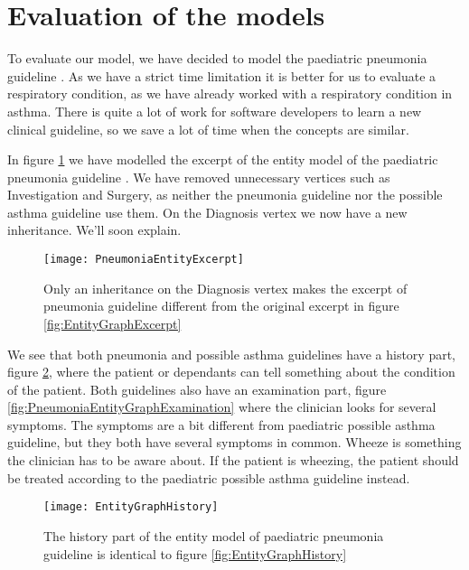 \section{Evaluation of the models}
To evaluate our model, we have decided to model the paediatric pneumonia guideline \parencite{RepublicofKeny2016}. As we have a strict time limitation it is better for us to evaluate a respiratory condition, as we have already worked with a respiratory condition in asthma. There is quite a lot of work for software developers to learn a new clinical guideline, so we save a lot of time when the concepts are similar.

In figure \ref{fig:PneumoniaEntityGraphExcerpt} we have modelled the excerpt of the entity model of the paediatric pneumonia guideline \parencite{RepublicofKeny2016}. We have removed unnecessary vertices such as Investigation and Surgery, as neither the pneumonia guideline nor the possible asthma guideline use them. On the Diagnosis vertex we now have a new inheritance. We'll soon explain.

\begin{figure}[h!]
	\texttt{[image: PneumoniaEntityExcerpt]}
	\caption {Only an inheritance on the Diagnosis vertex makes the excerpt of pneumonia guideline \parencite{RepublicofKeny2016} different from the original excerpt in figure \ref{fig:EntityGraphExcerpt}}
	\label{fig:PneumoniaEntityGraphExcerpt}
\end{figure}

We see that both pneumonia and possible asthma guidelines have a history part, figure \ref{fig:PneumoniaEntityGraphHistory}, where the patient or dependants can tell something about the condition of the patient. Both guidelines also have an examination part, figure \ref{fig:PneumoniaEntityGraphExamination} where the clinician looks for several symptoms. The symptoms are a bit different from paediatric possible asthma guideline, but they both have several symptoms in common. Wheeze is something the clinician has to be aware about. If the patient is wheezing, the patient should be treated according to the paediatric possible asthma guideline instead.

\begin{figure}[h!]
	\texttt{[image: EntityGraphHistory]}
	\caption {The history part of the entity model of paediatric pneumonia guideline \parencite{RepublicofKeny2016} is identical to figure \ref{fig:EntityGraphHistory}}
	\label{fig:PneumoniaEntityGraphHistory}
\end{figure}


